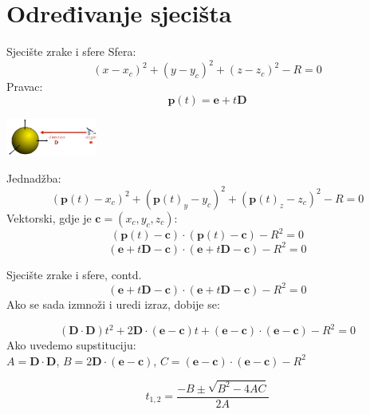 \documentclass[9pt]{beamer}
\begin{document}
\section{Određivanje sjecišta}
\begin{frame}{Sjecište zrake i sfere}
Sfera:
$$(x-x_c)^2 + (y-y_c)^2 + (z-z_c)^2 - R = 0$$
Pravac:
$$\textbf{p}(t) = \textbf{e}+t\textbf{D}$$
\begin{center}
	\includegraphics[width=3cm]{slike/ray_sfera.png}
\end{center}

Jednadžba:
$$(\textbf{p}(t)-x_c)^2 + (\textbf{p}(t)_y-y_c)^2 + (\textbf{p}(t)_z-z_c)^2 - R = 0$$
Vektorski, gdje je $\textbf{c}=(x_c, y_c, z_c)$:
$$(\textbf{p}(t)-\textbf{c})\cdot (\textbf{p}(t)-\textbf{c}) - R^2 = 0$$
$$(\textbf{e} + t\textbf{D}-\textbf{c})\cdot (\textbf{e} + t\textbf{D}-\textbf{c}) - R^2 = 0$$
\end{frame}	

\begin{frame}{Sjecište zrake i sfere, contd.}
$$(\textbf{e} + t\textbf{D}-\textbf{c})\cdot (\textbf{e} + t\textbf{D}-\textbf{c}) - R^2 = 0$$
Ako se sada izmnoži i uredi izraz, dobije se:

$$(\textbf{D}\cdot \textbf{D})t^2+2\textbf{D}\cdot(\textbf{e}-\textbf{c})t + (\textbf{e}-\textbf{c})\cdot(\textbf{e}-\textbf{c}) - R^2=0$$
Ako uvedemo supstituciju:\\
$A = \textbf{D}\cdot \textbf{D}$, $B = 2\textbf{D}\cdot(\textbf{e}-\textbf{c})$, $C = (\textbf{e}-\textbf{c})\cdot(\textbf{e}-\textbf{c}) - R^2$

$$t_{1,2} = \frac{-B \pm \sqrt{B^2-4AC}}{2A}$$
\end{frame}	
\end{document}
